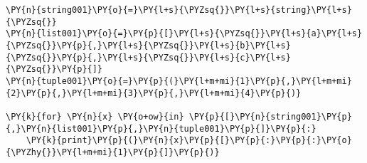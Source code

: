 \begin{Verbatim}[commandchars=\\\{\}]
\PY{n}{string001}\PY{o}{=}\PY{l+s}{\PYZsq{}}\PY{l+s}{string}\PY{l+s}{\PYZsq{}}
\PY{n}{list001}\PY{o}{=}\PY{p}{[}\PY{l+s}{\PYZsq{}}\PY{l+s}{a}\PY{l+s}{\PYZsq{}}\PY{p}{,}\PY{l+s}{\PYZsq{}}\PY{l+s}{b}\PY{l+s}{\PYZsq{}}\PY{p}{,}\PY{l+s}{\PYZsq{}}\PY{l+s}{c}\PY{l+s}{\PYZsq{}}\PY{p}{]}
\PY{n}{tuple001}\PY{o}{=}\PY{p}{(}\PY{l+m+mi}{1}\PY{p}{,}\PY{l+m+mi}{2}\PY{p}{,}\PY{l+m+mi}{3}\PY{p}{,}\PY{l+m+mi}{4}\PY{p}{)}

\PY{k}{for} \PY{n}{x} \PY{o+ow}{in} \PY{p}{[}\PY{n}{string001}\PY{p}{,}\PY{n}{list001}\PY{p}{,}\PY{n}{tuple001}\PY{p}{]}\PY{p}{:}
    \PY{k}{print}\PY{p}{(}\PY{n}{x}\PY{p}{[}\PY{p}{:}\PY{p}{:}\PY{o}{\PYZhy{}}\PY{l+m+mi}{1}\PY{p}{]}\PY{p}{)}
\end{Verbatim}
